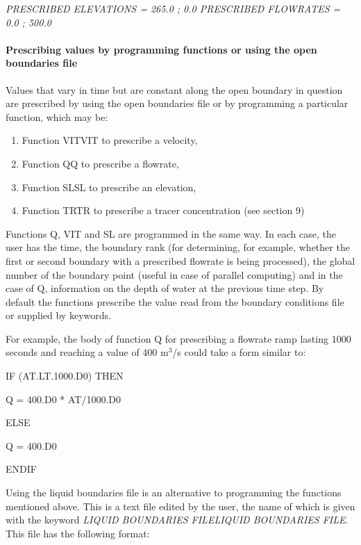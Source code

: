 \documentclass{article} %
\begin{document}
   \textit{PRESCRIBED ELEVATIONS = 265.0 ; 0.0   PRESCRIBED FLOWRATES = 0.0 ; 500.0}


\paragraph{ Prescribing values by programming functions or using the open boundaries file}

 Values that vary in time but are constant along the open boundary in question are prescribed by using the open boundaries file or by programming a particular function, which may be:

\begin{enumerate}
\item  Function VITVIT to prescribe a velocity,

\item  Function  QQ to prescribe a flowrate,

\item  Function  SLSL to prescribe an elevation,

\item  Function TRTR to prescribe a tracer concentration (see section 9)
\end{enumerate}

 Functions Q, VIT and SL are programmed in the same way. In each case, the user has the time, the boundary rank (for determining, for example, whether the first or second boundary with a prescribed flowrate is being processed), the global number of the boundary point (useful in case of parallel computing) and in the case of Q, information on the depth of water at the previous time step. By default the functions prescribe the value read from the boundary conditions file or supplied by keywords.

 For example, the body of function Q for prescribing a flowrate ramp lasting 1000 seconds and reaching a value of 400 m${}^{3}$/s could take a form similar to:

 IF (AT.LT.1000.D0) THEN

    Q = 400.D0 * AT/1000.D0

 ELSE

    Q = 400.D0

 ENDIF

 Using the liquid boundaries file is an alternative to programming the functions mentioned above. This is a text file edited by the user, the name of which is given with the keyword \textit{LIQUID BOUNDARIES FILELIQUID BOUNDARIES FILE}. This file has the following format:
\end{document}
